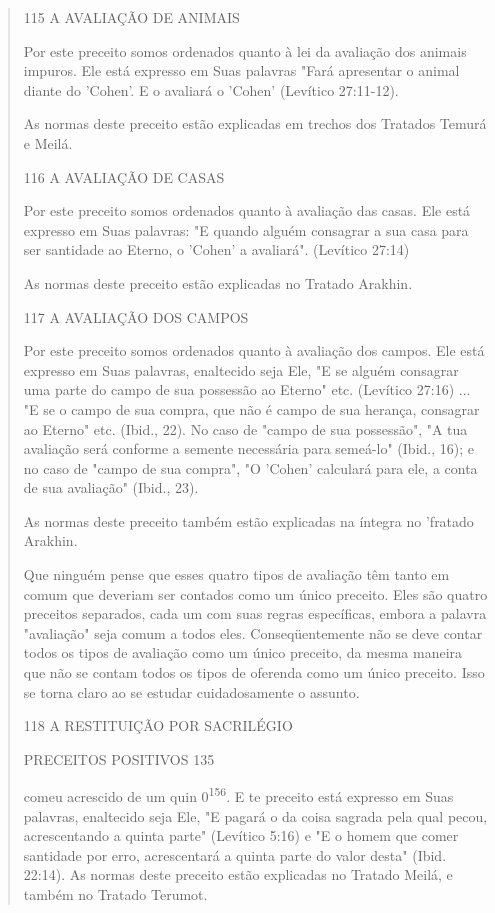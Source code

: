 \begin{quote}
115 A AVALIAÇÃO DE ANIMAIS

Por este preceito somos ordenados quanto à lei da avaliação dos ani­mais
impuros. Ele está expresso em Suas palavras "Fará apresentar o animal
dian­te do 'Cohen'. E o avaliará o 'Cohen' (Levítico 27:11-12).

As normas deste preceito estão explicadas em trechos dos Tratados Temurá
e Meilá.

116 A AVALIAÇÃO DE CASAS

Por este preceito somos ordenados quanto à avaliação das casas. Ele está
expresso em Suas palavras: "E quando alguém consagrar a sua casa para
ser santidade ao Eterno, o 'Cohen' a avaliará". (Levítico 27:14)

As normas deste preceito estão explicadas no Tratado Arakhin.

117 A AVALIAÇÃO DOS CAMPOS

Por este preceito somos ordenados quanto à avaliação dos campos. Ele
está expresso em Suas palavras, enaltecido seja Ele, "E se alguém
consagrar uma parte do campo de sua possessão ao Eterno" etc. (Levítico
27:16) ... "E se o campo de sua compra, que não é campo de sua herança,
consagrar ao Eterno" etc. (Ibid., 22). No caso de "campo de sua
possessão", "A tua avaliação será con­forme a semente necessária para
semeá-lo" (Ibid., 16); e no caso de "campo de sua compra", "O 'Cohen'
calculará para ele, a conta de sua avaliação" (Ibid., 23).

As normas deste preceito também estão explicadas na íntegra no 'fra­tado
Arakhin.

Que ninguém pense que esses quatro tipos de avaliação têm tanto em comum
que deveriam ser contados como um único preceito. Eles são qua­tro
preceitos separados, cada um com suas regras específicas, embora a
palavra "avaliação" seja comum a todos eles. Conseqüentemente não se
deve contar todos os tipos de avaliação como um único preceito, da mesma
maneira que não se contam todos os tipos de oferenda como um único
preceito. Isso se tor­na claro ao se estudar cuidadosamente o assunto.

118 A RESTITUIÇÃO POR SACRILÉGIO

PRECEITOS POSITIVOS 135

comeu acrescido de um quin 0\textsuperscript{156}. E te preceito está
expresso em Suas palavras, enaltecido seja Ele, "E pagará o da coisa
sagrada pela qual pecou, acrescen­tando a quinta parte" (Levítico 5:16)
e "E o homem que comer santidade por er­ro, acrescentará a quinta parte
do valor desta" (Ibid. 22:14). As normas deste pre­ceito estão
explicadas no Tratado Meilá, e também no Tratado Terumot.


\end{quote}
